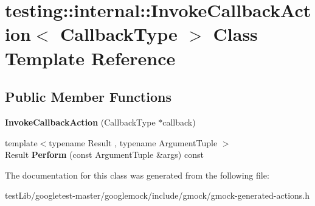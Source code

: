 \hypertarget{classtesting_1_1internal_1_1InvokeCallbackAction}{}\section{testing\+:\+:internal\+:\+:Invoke\+Callback\+Action$<$ Callback\+Type $>$ Class Template Reference}
\label{classtesting_1_1internal_1_1InvokeCallbackAction}
\subsection*{Public Member Functions}
\begin{DoxyCompactItemize}
\item 
\mbox{\label{classtesting_1_1internal_1_1InvokeCallbackAction_a21b051db0b2e1d33fd8d5cdfe7e6824b}} 
{\bfseries Invoke\+Callback\+Action} (Callback\+Type $\ast$callback)
\item 
\mbox{\label{classtesting_1_1internal_1_1InvokeCallbackAction_a74278acbfc51fe7407fdabc9d6a42c70}} 
{\footnotesize template$<$typename Result , typename Argument\+Tuple $>$ }\\Result {\bfseries Perform} (const Argument\+Tuple \&args) const
\end{DoxyCompactItemize}


The documentation for this class was generated from the following file\+:\begin{DoxyCompactItemize}
\item 
test\+Lib/googletest-\/master/googlemock/include/gmock/gmock-\/generated-\/actions.\+h\end{DoxyCompactItemize}
